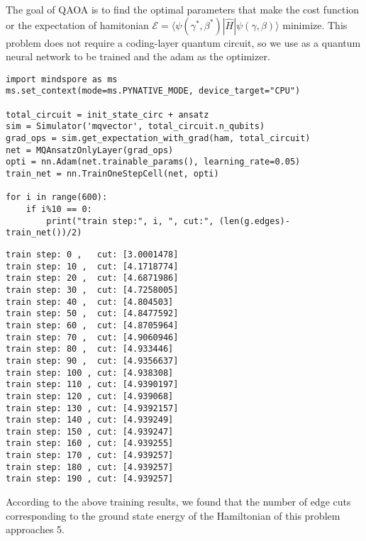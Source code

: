 The goal of QAOA is to find the optimal parameters that make the cost function or the expectation of hamitonian $\mathcal{E}=\langle \psi(\gamma^*, \beta^*)|\hat{H}|\psi(\gamma, \beta)\rangle$ minimize.
This problem does not require a coding-layer quantum circuit, so we use \MQAnsatzOnlyLayer as a quantum neural network to be trained and the adam as the optimizer.
\begin{lstlisting}
import mindspore as ms
ms.set_context(mode=ms.PYNATIVE_MODE, device_target="CPU")

total_circuit = init_state_circ + ansatz
sim = Simulator('mqvector', total_circuit.n_qubits)
grad_ops = sim.get_expectation_with_grad(ham, total_circuit)
net = MQAnsatzOnlyLayer(grad_ops)
opti = nn.Adam(net.trainable_params(), learning_rate=0.05)
train_net = nn.TrainOneStepCell(net, opti)

for i in range(600):
    if i%10 == 0:
        print("train step:", i, ", cut:", (len(g.edges)-train_net())/2)
\end{lstlisting}
\begin{lstlisting}
train step: 0 ,   cut: [3.0001478]
train step: 10 ,  cut: [4.1718774]
train step: 20 ,  cut: [4.6871986]
train step: 30 ,  cut: [4.7258005]
train step: 40 ,  cut: [4.804503]
train step: 50 ,  cut: [4.8477592]
train step: 60 ,  cut: [4.8705964]
train step: 70 ,  cut: [4.9060946]
train step: 80 ,  cut: [4.933446]
train step: 90 ,  cut: [4.9356637]
train step: 100 , cut: [4.938308]
train step: 110 , cut: [4.9390197]
train step: 120 , cut: [4.939068]
train step: 130 , cut: [4.9392157]
train step: 140 , cut: [4.939249]
train step: 150 , cut: [4.939247]
train step: 160 , cut: [4.939255]
train step: 170 , cut: [4.939257]
train step: 180 , cut: [4.939257]
train step: 190 , cut: [4.939257]
\end{lstlisting}

According to the above training results, we found that the number of edge cuts corresponding to the ground state energy of the Hamiltonian of this problem approaches 5.

